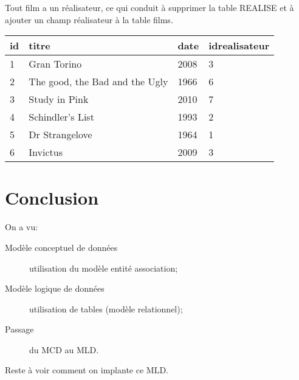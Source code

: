 \begin{rem}
  Tout film a un réalisateur, ce qui conduit à supprimer la table
REALISE et à ajouter un champ réalisateur à la table films.

\begin{center}
\begin{tabular}{llll}
\toprule
id & titre & date & idrealisateur\\
\midrule
1 & Gran Torino & 2008 & 3\\
2 & The good, the Bad and the Ugly& 1966 & 6\\
3 & Study in Pink & 2010 & 7\\
4 & Schindler's List& 1993 & 2\\
5 & Dr Strangelove&1964 & 1\\
6 & Invictus & 2009 & 3\\
\bottomrule
\end{tabular}
\end{center}
\end{rem}


\section{Conclusion}

On a vu:
\begin{description}
\item[Modèle conceptuel de données] utilisation du modèle entité association;
\item[Modèle logique de données] utilisation de tables (modèle relationnel);
\item[Passage]  du MCD au MLD.
\end{description}

Reste à voir comment on implante ce MLD.






